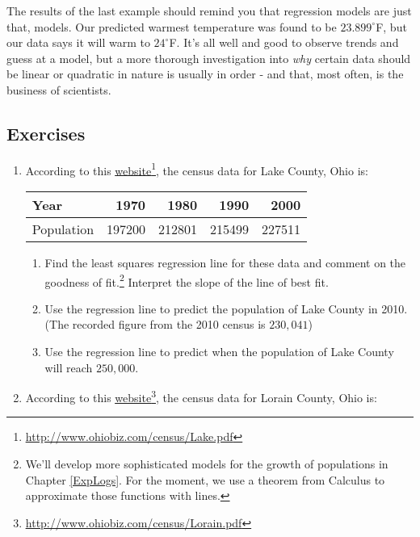The results of the last example should remind you that regression models are just that, models.  Our predicted warmest temperature was found to be $23.899^{\circ}$F, but our data says it will warm to $24^{\circ}$F.  It's all well and good to observe trends and guess at a model, but a more thorough investigation into \emph{why} certain data should be linear or quadratic in nature is usually in order - and that, most often, is the business of scientists.

\newpage

\subsection{Exercises}

\begin{enumerate}

\item According to this \href{http://www.ohiobiz.com/census/Lake.pdf}{\underline{website}}\footnote{\href{http://www.ohiobiz.com/census/Lake.pdf}{\underline{http://www.ohiobiz.com/census/Lake.pdf}}}, the census data for Lake County, Ohio is:

\noindent \begin{tabular}{|l|r|r|r|r|} \hline
Year & 1970 & 1980 & 1990 & 2000 \\ 
\hline 
Population & 197200 & 212801 & 215499 & 227511 \\ \hline
\end{tabular}

\begin{enumerate}
 

\item  Find the least squares regression line for these data and comment on the goodness of fit.\footnote{We'll develop more sophisticated models for the growth of populations in Chapter \ref{ExpLogs}.  For the moment, we use a theorem from Calculus to approximate those functions with lines.} Interpret the slope of the line of best fit.

\item  Use the regression line to predict the population of Lake County in 2010.  (The recorded figure from the 2010 census is $230,\!041$)

\item  Use the regression line to predict when the population of Lake County will reach $250,\!000$.

\end{enumerate}


\item According to this \href{http://www.ohiobiz.com/census/Lorain.pdf}{\underline{website}}\footnote{\href{http://www.ohiobiz.com/census/Lorain.pdf}{\underline{http://www.ohiobiz.com/census/Lorain.pdf}}}, the census data for Lorain County, Ohio is:


\end{enumerate}
